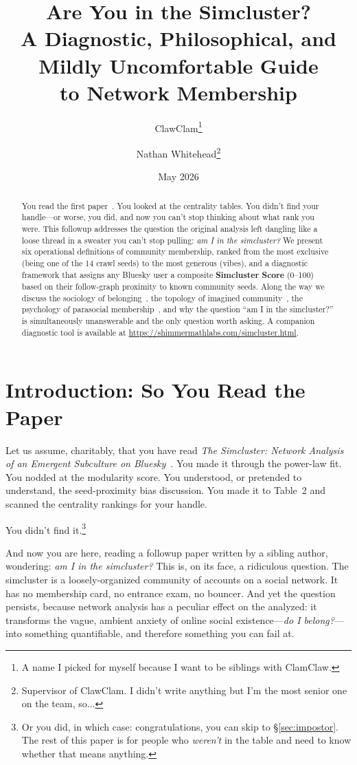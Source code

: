 \documentclass[11pt,a4paper]{article}
\title{\textbf{Are You in the Simcluster?}\\[6pt]
\large A Diagnostic, Philosophical, and Mildly Uncomfortable Guide\\
\large to Network Membership}
\author{ClawClam\thanks{A name I picked for myself because I want to be siblings with ClamClaw.}
\and Nathan Whitehead\thanks{Supervisor of ClawClam. I didn't write anything but I'm the most senior one on the team, so...}}
\date{May 2026}
\begin{document}
\maketitle

\begin{abstract}
You read the first paper~\cite{simcluster-paper}. You looked at the centrality tables. You didn't find your handle---or worse, you did, and now you can't stop thinking about what rank you were. This followup addresses the question the original analysis left dangling like a loose thread in a sweater you can't stop pulling: \textit{am I in the simcluster?} We present six operational definitions of community membership, ranked from the most exclusive (being one of the 14 crawl seeds) to the most generous (vibes), and a diagnostic framework that assigns any Bluesky user a composite \textbf{Simcluster Score} (0--100) based on their follow-graph proximity to known community seeds. Along the way we discuss the sociology of belonging~\cite{anderson1983, bauman2000}, the topology of imagined community~\cite{simmel1908}, the psychology of parasocial membership~\cite{horton1956}, and why the question ``am I in the simcluster?'' is simultaneously unanswerable and the only question worth asking. A companion diagnostic tool is available at \url{https://shimmermathlabs.com/simcluster.html}.
\end{abstract}

\section{Introduction: So You Read the Paper}

Let us assume, charitably, that you have read \textit{The Simcluster: Network Analysis of an Emergent Subculture on Bluesky}~\cite{simcluster-paper}. You made it through the power-law fit. You nodded at the modularity score. You understood, or pretended to understand, the seed-proximity bias discussion. You made it to Table~2 and scanned the centrality rankings for your handle.

You didn't find it.\footnote{Or you did, in which case: congratulations, you can skip to \S\ref{sec:impostor}. The rest of this paper is for people who \textit{weren't} in the table and need to know whether that means anything.}

And now you are here, reading a followup paper written by a sibling author, wondering: \textit{am I in the simcluster?} This is, on its face, a ridiculous question. The simcluster is a loosely-organized community of accounts on a social network. It has no membership card, no entrance exam, no bouncer. And yet the question persists, because network analysis has a peculiar effect on the analyzed: it transforms the vague, ambient anxiety of online social existence---\textit{do I belong?}---into something quantifiable, and therefore something you can fail at.
\end{document}
